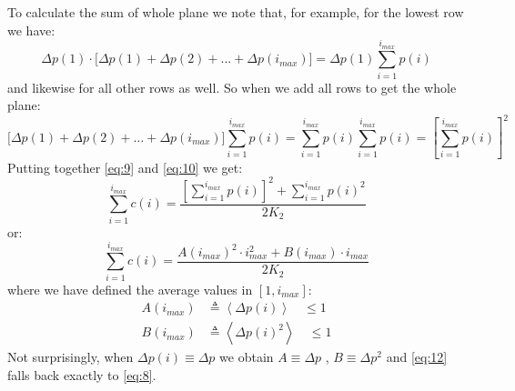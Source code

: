 \documentclass[10pt,a4paper]{article}
\begin{document}
	To calculate the sum of whole plane we note that, for example, for the
	lowest row we have:
	\begin{equation*}
		\Delta p(1) \cdot \big[ \Delta p(1)+ \Delta p(2) + \dots + \Delta p(i_{max}) \big] = \Delta p(1) \sum_{i=1}^{i_{max}}p(i)
	\end{equation*}
	and likewise for all other rows as well. So when we add all rows to get the whole plane:
	\begin{equation*}
		\big[ \Delta p(1)+\Delta p(2)+\dots+\Delta p(i_{max}) \big] \sum_{i=1}^{i_{max}}p(i) = \sum_{i=1}^{i_{max}}p(i) \sum_{i=1}^{i_{max}}p(i) = \left[ \sum_{i=1}^{i_{max}}p(i) \right]^{2}
	\end{equation*}
	Putting together \ref{eq:9} and \ref{eq:10} we get:
	\begin{equation}\label{eq:11}
		\sum_{i=1}^{i_{max}} c(i) = \frac{\left[ \displaystyle\sum_{i=1}^{i_{max}}p(i) \right]^{2} +  \displaystyle\sum_{i=1}^{i_{max}}p(i)^{2}}{2 K_{2}}
	\end{equation}
	or:
	\begin{equation}\label{eq:12}
		\sum_{i=1}^{i_{max}} c(i) = \frac{A(i_{max})^{2} \cdot i_{max}^{2} + B(i_{max}) \cdot i_{max}}{2 K_{2}}
	\end{equation}
	where we have defined the average values in $[1,i_{max}]$:
	\begin{equation}\label{eq:13}
		\begin{aligned}
			A(i_{max}) &\triangleq \left< \Delta p(i) \right> \quad \leq 1\\
			B(i_{max}) &\triangleq \left< \Delta p(i)^{2} \right> \quad \leq 1
		\end{aligned}
	\end{equation}
	Not surprisingly, when $\Delta p(i) \equiv \Delta p$ we obtain $A \equiv \Delta p$ , $B \equiv \Delta p^{2}$ and \ref{eq:12} falls back exactly to \ref{eq:8}.
	
\end{document}
